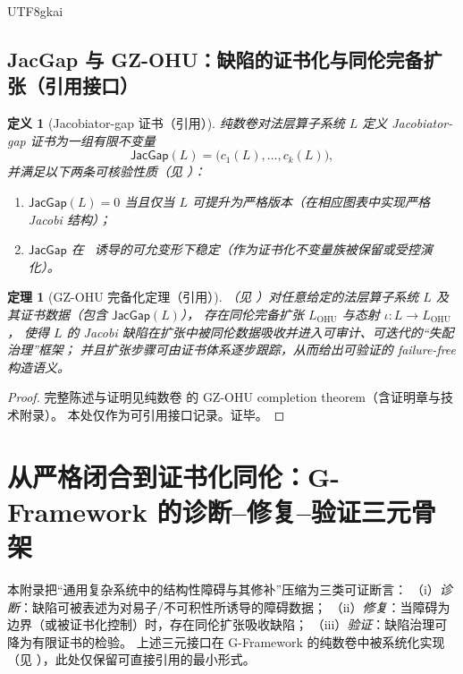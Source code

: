 \documentclass[12pt]{article}
\newtheorem{definition}{定义}[section]
\newtheorem{theorem}{定理}[section]
\begin{document}
\begin{CJK*}{UTF8}{gkai}
\subsection{JacGap 与 GZ-OHU：缺陷的证书化与同伦完备扩张（引用接口）}

\begin{definition}[Jacobiator-gap 证书（引用）]\label{def:B-jacgap}
纯数卷对法层算子系统 $L$ 定义 Jacobiator-gap 证书为一组有限不变量
\[
  \mathsf{JacGap}(L)=\bigl(c_1(L),\dots,c_k(L)\bigr),
\]
并满足以下两条可核验性质（见 \cite{GaoZheng2025GFramework}）：
\begin{enumerate}
  \item $\mathsf{JacGap}(L)=0$ 当且仅当 $L$ 可提升为严格版本（在相应图表中实现严格 Jacobi 结构）；
  \item $\mathsf{JacGap}$ 在 \GZTLC\ 诱导的可允变形下稳定（作为证书化不变量族被保留或受控演化）。
\end{enumerate}
\end{definition}

\begin{theorem}[GZ-OHU 完备化定理（引用）]\label{thm:B-gz-ohu}
（见 \cite{GaoZheng2025GFramework}）对任意给定的法层算子系统 $L$ 及其证书数据（包含 $\mathsf{JacGap}(L)$），
存在同伦完备扩张 $L_{\mathrm{OHU}}$ 与态射 $\iota:L\to L_{\mathrm{OHU}}$，
使得 $L$ 的 Jacobi 缺陷在扩张中被同伦数据吸收并进入可审计、可迭代的“失配治理”框架；
并且扩张步骤可由证书体系逐步跟踪，从而给出可验证的 failure-free 构造语义。
\end{theorem}

\begin{proof}
完整陈述与证明见纯数卷 \cite{GaoZheng2025GFramework} 的 GZ-OHU completion theorem（含证明章与技术附录）。
本处仅作为可引用接口记录。证毕。
\end{proof}

\clearpage

\section{从严格闭合到证书化同伦：G-Framework 的诊断--修复--验证三元骨架}\label{app:C-triad-drv}

本附录把“通用复杂系统中的结构性障碍与其修补”压缩为三类可证断言：
（i）\emph{诊断}：缺陷可被表述为对易子/不可积性所诱导的障碍数据；
（ii）\emph{修复}：当障碍为边界（或被证书化控制）时，存在同伦扩张吸收缺陷；
（iii）\emph{验证}：缺陷治理可降为有限证书的检验。
上述三元接口在 G-Framework 的纯数卷中被系统化实现（见 \cite{GaoZheng2025GFramework}），此处仅保留可直接引用的最小形式。


\end{CJK*}
\end{document}
